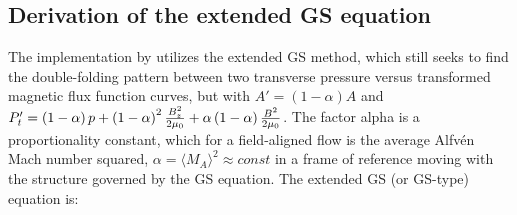 \subsection{Derivation of the extended GS equation}
The implementation by \cite{Chen:2021} utilizes the extended GS method, which still seeks to find the double-folding pattern between two \gls{transverse pressure} versus \gls{transformed magnetic flux function} curves, but with $A'=(1-\alpha)A$ and $P_t'=\left( 1-\alpha \right)p + \left( 1-\alpha \right)^2\frac{B_z^2}{2\mu_0} + \alpha\left( 1-\alpha \right)\frac{B^2}{2\mu_0}$.  The factor \gls{alpha} is a proportionality constant, which for a field-aligned flow is the average Alfv\'en Mach number squared, $\alpha=\langle M_A\rangle^2 \approx const$ in a frame of reference moving with the structure governed by the GS equation. The extended GS (or GS-type) equation \citep{Teh:2018, Sonnerup:2006} is:

